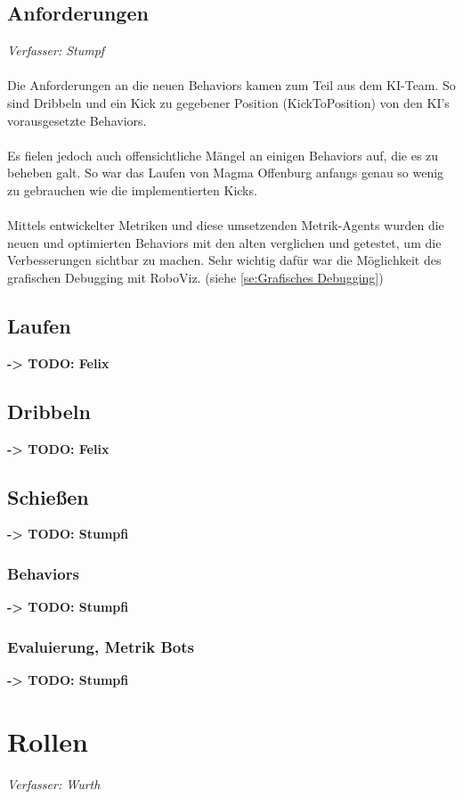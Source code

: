 \documentclass[fontsize=12pt,a4paper,final]{scrartcl}[2003/01/01]
\begin{document}
\subsection{Anforderungen}
\textit{Verfasser: Stumpf}\\
\\
Die Anforderungen an die neuen Behaviors kamen zum Teil aus dem KI-Team. So sind Dribbeln und ein Kick zu gegebener Position (KickToPosition) von den KI's vorausgesetzte Behaviors.\\
\\
Es fielen jedoch auch offensichtliche Mängel an einigen Behaviors auf, die es zu beheben galt. So war das Laufen von Magma Offenburg anfangs genau so wenig zu gebrauchen wie die implementierten Kicks.\\
\\
Mittels entwickelter Metriken und diese umsetzenden Metrik-Agents wurden die neuen und optimierten Behaviors mit den alten verglichen und getestet, um die Verbesserungen sichtbar zu machen. Sehr wichtig dafür war die Möglichkeit des grafischen Debugging mit RoboViz. (siehe \autoref{se:Grafisches Debugging})

\subsection{Laufen}\label{sse:Elem Bew:Laufen}
\textbf{-> TODO: Felix}
\subsection{Dribbeln}\label{sse:Elem Bew:Dribbeln}
\textbf{-> TODO: Felix}
\subsection{Schie{\ss}en}\label{sse:Elem Bew:Schiessen}
\textbf{-> TODO: Stumpfi}
\subsubsection{Behaviors}
\textbf{-> TODO: Stumpfi}
\subsubsection{Evaluierung, Metrik Bots}
\textbf{-> TODO: Stumpfi}

\section{Rollen}
\textit{Verfasser: Wurth}\\
\end{document}
